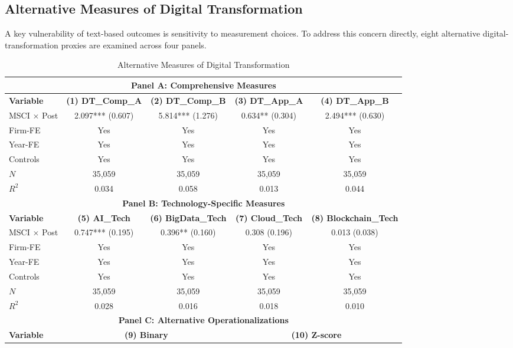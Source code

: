 \subsection{Alternative Measures of Digital Transformation}
\label{sec:alt_measures}

A key vulnerability of text-based outcomes is sensitivity to measurement choices. To address this concern directly, eight alternative digital-transformation proxies are examined across four panels.

\begin{table}[htbp]
\centering
\caption{Alternative Measures of Digital Transformation}
\label{tab:alt_measures}
\small
\setlength{\tabcolsep}{4.5pt}
\begin{tabular}{lcccc}
\toprule
\multicolumn{5}{c}{\textbf{Panel A: Comprehensive Measures}} \\
\midrule
\textbf{Variable} & \textbf{(1) DT\_Comp\_A} & \textbf{(2) DT\_Comp\_B} & \textbf{(3) DT\_App\_A} & \textbf{(4) DT\_App\_B} \\
\midrule
MSCI $\times$ Post & 2.097*** (0.607) & 5.814*** (1.276) & 0.634** (0.304) & 2.494*** (0.630) \\
Firm-FE & Yes & Yes & Yes & Yes \\
Year-FE & Yes & Yes & Yes & Yes \\
Controls & Yes & Yes & Yes & Yes \\
$N$ & 35,059 & 35,059 & 35,059 & 35,059 \\
$R^2$ & 0.034 & 0.058 & 0.013 & 0.044 \\
\midrule
\multicolumn{5}{c}{\textbf{Panel B: Technology-Specific Measures}} \\
\midrule
\textbf{Variable} & \textbf{(5) AI\_Tech} & \textbf{(6) BigData\_Tech} & \textbf{(7) Cloud\_Tech} & \textbf{(8) Blockchain\_Tech} \\
\midrule
MSCI $\times$ Post & 0.747*** (0.195) & 0.396** (0.160) & 0.308 (0.196) & 0.013 (0.038) \\
Firm-FE & Yes & Yes & Yes & Yes \\
Year-FE & Yes & Yes & Yes & Yes \\
Controls & Yes & Yes & Yes & Yes \\
$N$ & 35,059 & 35,059 & 35,059 & 35,059 \\
$R^2$ & 0.028 & 0.016 & 0.018 & 0.010 \\
\midrule
\multicolumn{5}{c}{\textbf{Panel C: Alternative Operationalizations}} \\
\midrule
\textbf{Variable} & \multicolumn{2}{c}{\textbf{(9) Binary}} & \multicolumn{2}{c}{\textbf{(10) Z-score}} \\

\end{tabular}
\end{table}
